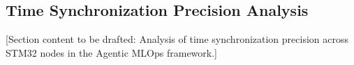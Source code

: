 \subsection{Time Synchronization Precision Analysis}
\label{subsec:time_sync}

[Section content to be drafted: Analysis of time synchronization precision across STM32 nodes in the Agentic MLOps framework.]
